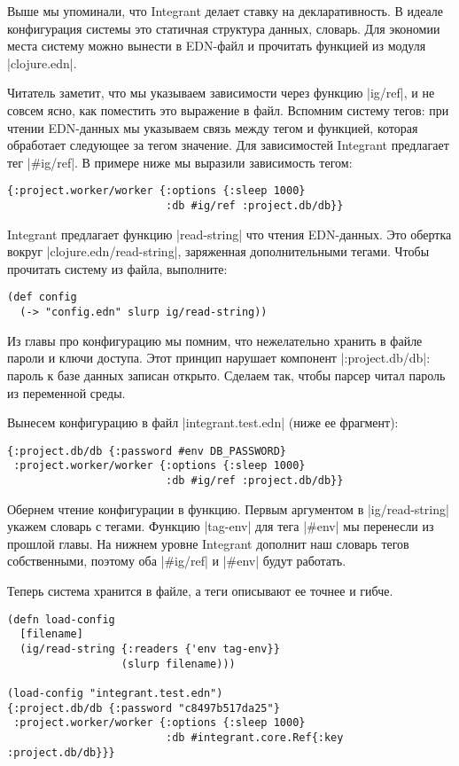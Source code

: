 Выше мы упоминали, что Integrant делает ставку на декларативность. В идеале
конфигурация системы это статичная структура данных, словарь. Для экономии места
систему можно вынести в EDN-файл и прочитать функцией из модуля \spverb|clojure.edn|.

Читатель заметит, что мы указываем зависимости через функцию \spverb|ig/ref|, и не
совсем ясно, как поместить это выражение в файл. Вспомним систему тегов: при
чтении EDN-данных мы указываем связь между тегом и функцией, которая обработает
следующее за тегом значение. Для зависимостей Integrant предлагает тег
\spverb|#ig/ref|. В примере ниже мы выразили зависимость тегом:

\begin{verbatim}
{:project.worker/worker {:options {:sleep 1000}
                         :db #ig/ref :project.db/db}}
\end{verbatim}

Integrant предлагает функцию \spverb|read-string| что чтения EDN-данных. Это обертка
вокруг \spverb|clojure.edn/read-string|, заряженная дополнительными тегами. Чтобы
прочитать систему из файла, выполните:

\begin{verbatim}
(def config
  (-> "config.edn" slurp ig/read-string))
\end{verbatim}

Из главы про конфигурацию мы помним, что нежелательно хранить в файле пароли и
ключи доступа. Этот принцип нарушает компонент \spverb|:project.db/db|: пароль к базе
данных записан открыто. Сделаем так, чтобы парсер читал пароль из переменной
среды.

Вынесем конфигурацию в файл \spverb|integrant.test.edn| (ниже ее фрагмент):

\begin{verbatim}
{:project.db/db {:password #env DB_PASSWORD}
 :project.worker/worker {:options {:sleep 1000}
                         :db #ig/ref :project.db/db}}
\end{verbatim}

Обернем чтение конфигурации в функцию. Первым аргументом в \spverb|ig/read-string|
укажем словарь с тегами. Функцию \spverb|tag-env| для тега \spverb|#env| мы перенесли из
прошлой главы. На нижнем уровне Integrant дополнит наш словарь тегов
собственными, поэтому оба \spverb|#ig/ref| и \spverb|#env| будут работать.

Теперь система хранится в файле, а теги описывают ее точнее и гибче.

\begin{verbatim}
(defn load-config
  [filename]
  (ig/read-string {:readers {'env tag-env}}
                  (slurp filename)))

(load-config "integrant.test.edn")
{:project.db/db {:password "c8497b517da25"}
 :project.worker/worker {:options {:sleep 1000}
                         :db #integrant.core.Ref{:key :project.db/db}}}
\end{verbatim}

